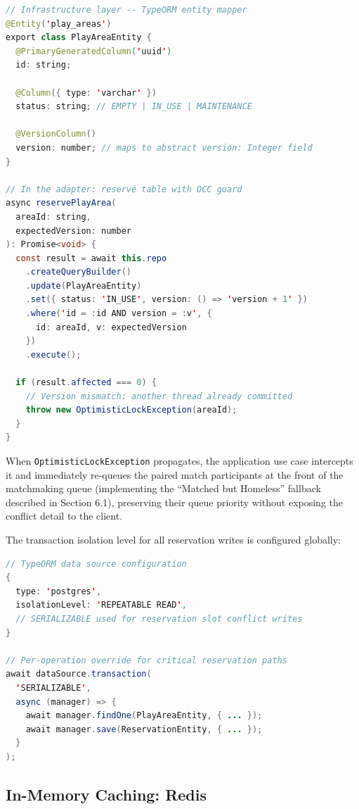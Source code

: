 \documentclass[11pt,a4paper]{report}
\begin{document}
\begin{lstlisting}[language=Java, caption={TypeORM OCC decorator on PlayArea entity}]
// Infrastructure layer -- TypeORM entity mapper
@Entity('play_areas')
export class PlayAreaEntity {
  @PrimaryGeneratedColumn('uuid')
  id: string;

  @Column({ type: 'varchar' })
  status: string; // EMPTY | IN_USE | MAINTENANCE

  @VersionColumn()
  version: number; // maps to abstract version: Integer field
}

// In the adapter: reserve table with OCC guard
async reservePlayArea(
  areaId: string,
  expectedVersion: number
): Promise<void> {
  const result = await this.repo
    .createQueryBuilder()
    .update(PlayAreaEntity)
    .set({ status: 'IN_USE', version: () => 'version + 1' })
    .where('id = :id AND version = :v', {
      id: areaId, v: expectedVersion
    })
    .execute();

  if (result.affected === 0) {
    // Version mismatch: another thread already committed
    throw new OptimisticLockException(areaId);
  }
}
\end{lstlisting}

When \texttt{OptimisticLockException} propagates, the application use case intercepts it and immediately re-queues the paired match participants at the front of the matchmaking queue (implementing the ``Matched but Homeless'' fallback described in Section 6.1), preserving their queue priority without exposing the conflict detail to the client.

The transaction isolation level for all reservation writes is configured globally:

\begin{lstlisting}[language=Java, caption={PostgreSQL transaction isolation configuration}]
// TypeORM data source configuration
{
  type: 'postgres',
  isolationLevel: 'REPEATABLE READ',
  // SERIALIZABLE used for reservation slot conflict writes
}

// Per-operation override for critical reservation paths
await dataSource.transaction(
  'SERIALIZABLE',
  async (manager) => {
    await manager.findOne(PlayAreaEntity, { ... });
    await manager.save(ReservationEntity, { ... });
  }
);
\end{lstlisting}

\subsection{In-Memory Caching: Redis}
\end{document}
